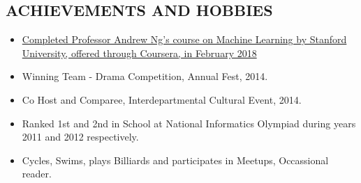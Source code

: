 \documentclass[margin]{res}
\begin{document}
\begin{resume}
\section{ACHIEVEMENTS AND HOBBIES}
	\begin{itemize}
		\item \href {https://www.coursera.org/account/accomplishments/certificate/SRFZET55PNVJ} {Completed Professor Andrew Ng's course on Machine Learning by Stanford University, offered through Coursera, in February 2018}
		\item Winning Team - Drama Competition, Annual Fest, 2014.
		\item Co Host and Comparee, Interdepartmental Cultural Event, 2014.
		\item Ranked 1st and 2nd in School at National Informatics Olympiad during years 2011 and 2012 respectively.
		\item Cycles, Swims, plays Billiards and participates in Meetups, Occassional reader.
	\end{itemize}

\end{resume}
\end{document}
